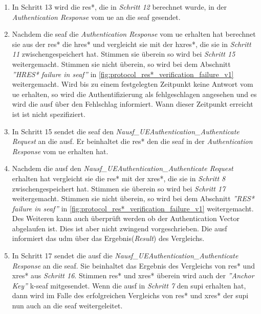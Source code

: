 \begin{enumerate}
\item In Schritt 13 wird die \gls{res*}, die in \textit{Schritt 12} berechnet wurde, in der \textit{Authentication Response} vom \gls{ue} an die \gls{seaf} gesendet.

\item Nachdem die \gls{seaf} die \textit{Authentication Response} vom \gls{ue} erhalten hat berechnet sie aus der \gls{res*} die \gls{hres*} und vergleicht sie mit der \gls{hxres*}, die sie in \textit{Schritt 11} zwischengespeichert hat.
Stimmen sie \"uberein so wird bei \textit{Schritt 15} weitergemacht.
Stimmen sie nicht \"uberein, so wird bei dem Abschnitt \textit{''HRES* failure in \gls{seaf}''} in \cref{fig:protocol_res*_verification_failure_v1} weitergemacht.
Wird bis zu einem festgelegten Zeitpunkt keine Antwort vom \gls{ue} erhalten, so wird die Authentifizierung als fehlgeschlagen angesehen und es wird die \gls{ausf} \"uber den Fehlschlag informiert.
Wann dieser Zeitpunkt erreicht ist ist nicht spezifiziert.

\item In Schritt 15 sendet die \gls{seaf} den \textit{Nausf\_UEAuthentication\_Authenticate Request} an die \gls{ausf}.
Er beinhaltet die \gls{res*} den die \gls{seaf} in der \textit{Authentication Response} vom \gls{ue} erhalten hat.

\item Nachdem die \gls{ausf} den \textit{Nausf\_UEAuthentication\_Authenticate Request} erhalten hat vergleicht sie die \gls{res*} mit der \gls{xres*}, die sie in \textit{Schritt 8} zwischengespeichert hat.
Stimmen sie \"uberein so wird bei \textit{Schritt 17} weitergemacht.
Stimmen sie nicht \"uberein, so wird bei dem Abschnitt \textit{''RES* failure in \gls{seaf}''} in \cref{fig:protocol_res*_verification_failure_v1} weitergemacht.
Des Weiteren kann auch \"uberpr\"uft werden ob der Authentication Vector abgelaufen ist.
Dies ist aber nicht zwingend vorgeschrieben.
Die \gls{ausf} informiert das \gls{udm} über das Ergebnis(\textit{Result}) des Vergleichs.

\item In Schritt 17 sendet die \gls{ausf} die \textit{Nausf\_UEAuthentication\_Authenticate Response} an die \gls{seaf}.
Sie beinhaltet das Ergebnis des Vergleichs von \gls{res*} und \gls{xres*} aus \textit{Schritt 16}.
Stimmen \gls{res*} und \gls{xres*} \"uberein wird auch der \textit{''Anchor Key''} \gls{k-seaf} mitgesendet.
Wenn die \gls{ausf} in \textit{Schritt 7} den \gls{supi} erhalten hat, dann wird im Falle des erfolgreichen Vergleichs von \gls{res*} und \gls{xres*} der \gls{supi} nun auch an die \gls{seaf} weitergeleitet.
\end{enumerate}


